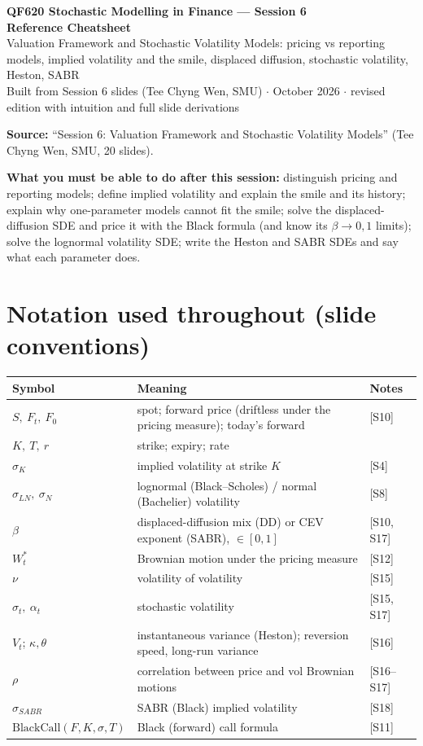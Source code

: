 \documentclass[10pt]{article}
\begin{document}
\begin{center}
{\LARGE\bfseries QF620 Stochastic Modelling in Finance --- Session 6\\[2pt] Reference Cheatsheet}\\[6pt]
{\large Valuation Framework and Stochastic Volatility Models: pricing vs reporting models, implied volatility and the smile, displaced diffusion, stochastic volatility, Heston, SABR}\\[4pt]
{\small Built from Session 6 slides (Tee Chyng Wen, SMU) $\cdot$ October 2026 $\cdot$ revised edition with intuition and full slide derivations}
\end{center}
\tableofcontents
\vspace{4pt}
\textbf{Source:} ``Session 6: Valuation Framework and Stochastic Volatility Models'' (Tee Chyng Wen, SMU, 20 slides).

\legend

\textbf{What you must be able to do after this session:} distinguish pricing and reporting models; define implied volatility and explain the smile and its history; explain why one-parameter models cannot fit the smile; solve the displaced-diffusion SDE and price it with the Black formula (and know its $\beta\to0,1$ limits); solve the lognormal volatility SDE; write the Heston and SABR SDEs and say what each parameter does.

\section*{Notation used throughout (slide conventions)}
{\small\renewcommand{\arraystretch}{1.12}
\begin{tabularx}{\linewidth}{@{}l X l@{}}\toprule
Symbol & Meaning & Notes\\\midrule
$S,\ F_t,\ F_0$ & spot; forward price (driftless under the pricing measure); today's forward & [S10]\\
$K,\ T,\ r$ & strike; expiry; rate & \\
$\sigma_K$ & implied volatility at strike $K$ & [S4]\\
$\sigma_{LN},\ \sigma_N$ & lognormal (Black--Scholes) / normal (Bachelier) volatility & [S8]\\
$\beta$ & displaced-diffusion mix (DD) or CEV exponent (SABR), $\in[0,1]$ & [S10, S17]\\
$W^*_t$ & Brownian motion under the pricing measure & [S12]\\
$\nu$ & volatility of volatility & [S15]\\
$\sigma_t,\ \alpha_t$ & stochastic volatility & [S15, S17]\\
$V_t$; $\kappa,\theta$ & instantaneous variance (Heston); reversion speed, long-run variance & [S16]\\
$\rho$ & correlation between price and vol Brownian motions & [S16--S17]\\
$\sigma_{SABR}$ & SABR (Black) implied volatility & [S18]\\
$\mathrm{BlackCall}(F,K,\sigma,T)$ & Black (forward) call formula & [S11]\\\bottomrule
\end{tabularx}}
\end{document}
